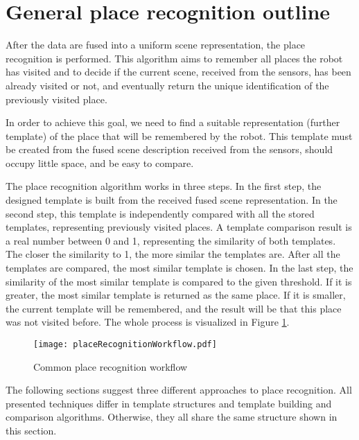 \section{General place recognition outline}

After the data are fused into a uniform scene representation, the place recognition is performed. This algorithm aims to remember all places the robot has visited and to decide if the current scene, received from the sensors, has been already visited or not, and eventually return the unique identification of the previously visited place.\par
In order to achieve this goal, we need to find a suitable representation (further template) of the place that will be remembered by the robot. This template must be created from the fused scene description received from the sensors, should occupy little space, and be easy to compare.\par
The place recognition algorithm works in three steps. In the first step, the designed template is built from the received fused scene representation. In the second step, this template is independently compared with all the stored templates, representing previously visited places. A template comparison result is a real number between 0 and 1, representing the similarity of both templates. The closer the similarity to 1, the more similar the templates are. After all the templates are compared, the most similar template is chosen. In the last step, the similarity of the most similar template is compared to the given threshold. If it is greater, the most similar template is returned as the same place. If it is smaller, the current template will be remembered, and the result will be that this place was not visited before. The whole process is visualized in Figure \ref{fig:placeRecognitionWorkflow}.\par

\begin{figure}[htpb]
    \centering
    \texttt{[image: placeRecognitionWorkflow.pdf]}
    \caption{Common place recognition workflow} \label{fig:placeRecognitionWorkflow}
\end{figure}

The following sections suggest three different approaches to place recognition. All presented techniques differ in template structures and template building and comparison algorithms. Otherwise, they all share the same structure shown in this section.